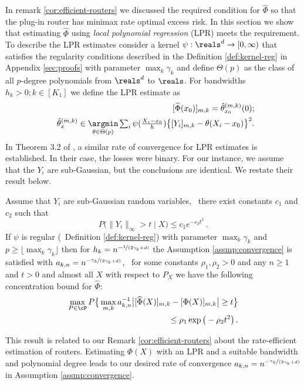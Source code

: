 In remark \ref{cor:efficient-routers} we discussed the required condition for $\widehat \Phi$ so that the plug-in router has minimax rate optimal excess risk. In this section we show that estimating $\widehat \Phi$ using \emph{local polynomial regression} (LPR) meets the requirement.  To describe the LPR estimates consider a kernel $\psi: \reals^d \to [0, \infty)$ that satisfies the regularity conditions described in the Definition \ref{def:kernel-reg} in  Appendix \ref{sec:proofs} with parameter $\max_k \gamma_k$ and define $\Theta(p)$ as the class of all $p$-degree polynomials from $\reals^d$ to $\reals$. For bandwidths $h_k > 0; k \in [K_1]$ we define the LPR estimate as 
\begin{align}\label{eq:LPR}
    [\widehat \Phi(x_0)]_{m, k} = \hat\theta_{x_0}^{(m, k)}(0); \nonumber \\
    ~~ \hat \theta_x^{(m, k)} \in \underset{\theta \in \Theta(p)}{\argmin}  \textstyle \sum_{i} \psi (\frac{X_i - x_0}{h}) \big \{[Y_i]_{m ,k} - \theta (X_i -x_0 )\big\}^2. 
\end{align}
In Theorem 3.2 of \citet{audibert2007Fast}, a similar rate of convergence for LPR estimates is established. In their case, the losses were binary. For our instance, we assume that the $Y_i$ are sub-Gaussian, but the conclusions are identical. We restate their result below.
\begin{lemma}
    Assume that $Y_i$ are sub-Gaussian random variables, \ie\ there exist constants $c_1$ and $c_2$ such that  
    \[
    \textstyle P\big ( \|Y_i\|_\infty > t \mid X\big ) \le c_1 e^{-c_2t^2}\,. 
    \] If $\psi$ is regular (\cf\ Definition \ref{def:kernel-reg}) with parameter $\max_k \gamma_k$  and $p \ge  \lfloor \max_k \gamma_k \rfloor$ then for $h_k = n^{-\nicefrac{1}{(2\gamma_k + d)}}$ the Assumption \ref{assmp:convergence} is satisfied with $a_{k, n} = n^{-\nicefrac{\gamma_k}{(2\gamma_k + d)}}$, \ie\ for some constants $\rho_1, \rho_2 > 0$ and any $n \ge 1$ and $t > 0$ and almost all $X$ with respect to $P_X$ we have the following concentration bound for $\widehat \Phi$:
    \begin{align}\label{eq:concentration-phi-2}
        \max_{P\in \cP} P \big \{ \max_{m, k} a_{k, n}^{-1}\big |[\widehat \Phi (X)]_{m, k} - [\Phi  (X)]_{m, k}\big |  \ge t\big \} \nonumber \\
        \le  \rho_1 \exp\big (- \rho_2  t^2 \big )\,.
    \end{align}
\end{lemma}
This result is related to our Remark \ref{cor:efficient-routers} about the rate-efficient estimation of routers. Estimating $\Phi(X)$ with an LPR and a suitable bandwidth and polynomial degree leads to our desired rate of convergence $a_{k, n} = n^{-\nicefrac{\gamma_k}{(2\gamma_k + d)}}$ in Assumption \ref{assmp:convergence}. 

